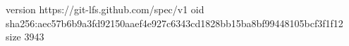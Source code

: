 version https://git-lfs.github.com/spec/v1
oid sha256:aec57b6b9a3fd92150aaef4e927c6343cd1828bb15ba8bf99448105bcf3f1f12
size 3943
